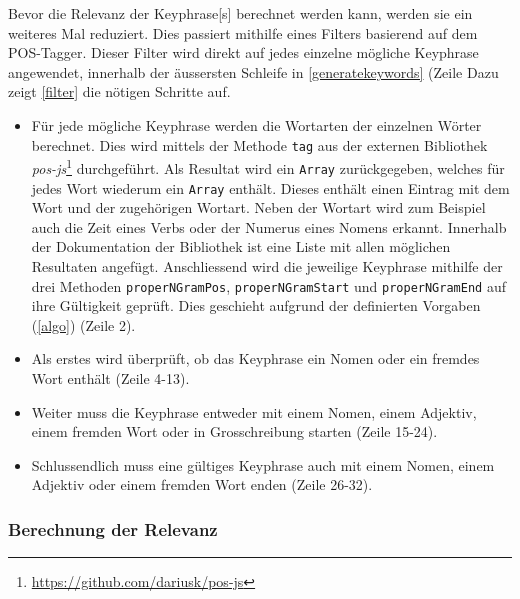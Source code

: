 
Bevor die Relevanz der \gls{Keyphrase}[s] berechnet werden kann, werden sie ein weiteres Mal reduziert. Dies passiert mithilfe eines Filters basierend auf dem POS-Tagger. Dieser Filter wird direkt auf jedes einzelne mögliche \gls{Keyphrase} angewendet, innerhalb der äussersten Schleife in \autoref{generatekeywords} (Zeile Dazu zeigt \autoref{filter} die nötigen Schritte auf.
\begin{itemize}
    \item Für jede mögliche \gls{Keyphrase} werden die Wortarten der einzelnen Wörter berechnet. Dies wird mittels der Methode \texttt{tag} aus der externen Bibliothek \textit{pos-js}\footnote{\url{https://github.com/dariusk/pos-js}} durchgeführt. Als Resultat wird ein \texttt{Array} zurückgegeben, welches für jedes Wort wiederum ein \texttt{Array} enthält. Dieses enthält einen Eintrag mit dem Wort und der zugehörigen Wortart. Neben der Wortart wird zum Beispiel auch die Zeit eines Verbs oder der Numerus eines Nomens erkannt. Innerhalb der Dokumentation der Bibliothek ist eine Liste mit allen möglichen Resultaten angefügt. Anschliessend wird die jeweilige \gls{Keyphrase} mithilfe der drei Methoden \texttt{properNGramPos}, \texttt{properNGramStart} und \texttt{properNGramEnd} auf ihre Gültigkeit geprüft. Dies geschieht aufgrund der definierten Vorgaben (\autoref{algo}) (Zeile 2). 
    \item Als erstes wird überprüft, ob das \gls{Keyphrase} ein Nomen oder ein fremdes Wort enthält (Zeile 4-13).
    \item Weiter muss die \gls{Keyphrase} entweder mit einem Nomen, einem Adjektiv, einem fremden Wort oder in Grosschreibung starten (Zeile 15-24).
    \item Schlussendlich muss eine gültiges \gls{Keyphrase} auch mit einem Nomen, einem Adjektiv oder einem fremden Wort enden (Zeile 26-32).
\end{itemize}




\subsubsection{Berechnung der Relevanz}

